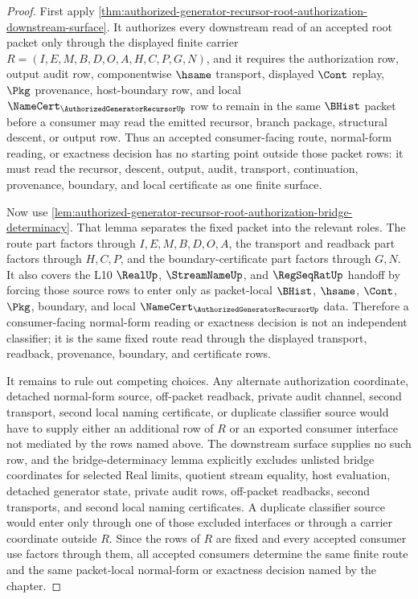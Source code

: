 \begin{proof}
First apply \autoref{thm:authorized-generator-recursor-root-authorization-downstream-surface}. It authorizes every downstream read of an accepted root packet only through the displayed finite carrier $R=(I,E,M,B,D,O,A,H,C,P,G,N)$, and it requires the authorization row, output audit row, componentwise $\hsame$ transport, displayed $\Cont$ replay, $\Pkg$ provenance, host-boundary row, and local $\NameCert_{\AuthorizedGeneratorRecursorUp}$ row to remain in the same $\BHist$ packet before a consumer may read the emitted recursor, branch package, structural descent, or output row. Thus an accepted consumer-facing route, normal-form reading, or exactness decision has no starting point outside those packet rows: it must read the recursor, descent, output, audit, transport, continuation, provenance, boundary, and local certificate as one finite surface.

Now use \autoref{lem:authorized-generator-recursor-root-authorization-bridge-determinacy}. That lemma separates the fixed packet into the relevant roles. The route part factors through $I,E,M,B,D,O,A$, the transport and readback part factors through $H,C,P$, and the boundary-certificate part factors through $G,N$. It also covers the L10 $\RealUp$, $\StreamNameUp$, and $\RegSeqRatUp$ handoff by forcing those source rows to enter only as packet-local $\BHist$, $\hsame$, $\Cont$, $\Pkg$, boundary, and local $\NameCert_{\AuthorizedGeneratorRecursorUp}$ data. Therefore a consumer-facing normal-form reading or exactness decision is not an independent classifier; it is the same fixed route read through the displayed transport, readback, provenance, boundary, and certificate rows.

It remains to rule out competing choices. Any alternate authorization coordinate, detached normal-form source, off-packet readback, private audit channel, second transport, second local naming certificate, or duplicate classifier source would have to supply either an additional row of $R$ or an exported consumer interface not mediated by the rows named above. The downstream surface supplies no such row, and the bridge-determinacy lemma explicitly excludes unlisted bridge coordinates for selected Real limits, quotient stream equality, host evaluation, detached generator state, private audit rows, off-packet readbacks, second transports, and second local naming certificates. A duplicate classifier source would enter only through one of those excluded interfaces or through a carrier coordinate outside $R$. Since the rows of $R$ are fixed and every accepted consumer use factors through them, all accepted consumers determine the same finite route and the same packet-local normal-form or exactness decision named by the chapter.
\end{proof}
